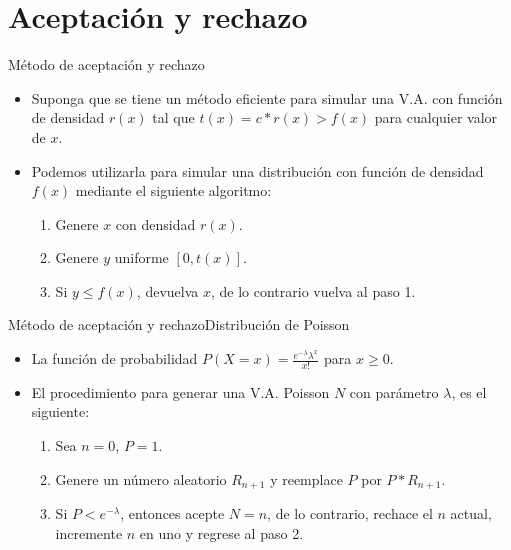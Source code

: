 \section{Aceptación y rechazo}

\begin{frame}{Método de aceptación y rechazo}
    \begin{itemize}
        \item Suponga que se tiene un método eficiente para simular una V.A. con función de densidad $r(x)$ tal que $t(x)=c*r(x)>f(x)$ para cualquier valor de $x$.
        \item Podemos utilizarla para simular una distribución con función de densidad $f(x)$ mediante el siguiente algoritmo:
        \begin{enumerate}
            \item Genere $x$ con densidad $r(x)$.
            \item Genere $y$ uniforme $[0,t(x)]$.
            \item Si $y\leq f(x)$, devuelva $x$, de lo contrario vuelva al paso 1.
        \end{enumerate}
    \end{itemize}
\end{frame}

\begin{frame}{Método de aceptación y rechazo}{Distribución de Poisson}
    \begin{itemize}
        \item La función de probabilidad $P(X=x)=\frac{e^{-\lambda}\lambda^x}{x!}$ para $x\geq 0$.
        \item El procedimiento para generar una V.A. Poisson $N$ con parámetro $\lambda$, es el siguiente:
        \begin{enumerate}
            \item Sea $n=0$, $P=1$.
            \item Genere un número aleatorio $R_{n+1}$ y reemplace $P$ por $P*R_{n+1}$.
            \item Si $P<e^{-\lambda}$, entonces acepte $N=n$, de lo contrario, rechace el $n$ actual, incremente $n$ en uno y regrese al paso 2.
        \end{enumerate}
    \end{itemize}
\end{frame}